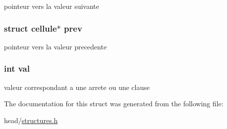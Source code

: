 pointeur vers la valeur suivante 

\hypertarget{structcellule_aa3f0f03704e6715898722d969a262a9c}{
\subsubsection[{prev}]{\setlength{\rightskip}{0pt plus 5cm}struct {\bf cellule}$\ast$ prev}}\label{structcellule_aa3f0f03704e6715898722d969a262a9c}


pointeur vers la valeur precedente 

\hypertarget{structcellule_aa0ccb5ee6d882ee3605ff47745c6467b}{
\subsubsection[{val}]{\setlength{\rightskip}{0pt plus 5cm}int val}}\label{structcellule_aa0ccb5ee6d882ee3605ff47745c6467b}


valeur correspondant a une arrete ou une clause 



The documentation for this struct was generated from the following file\-:\begin{DoxyCompactItemize}
\item 
head/\hyperlink{structures_8h}{structures.\-h}\end{DoxyCompactItemize}

